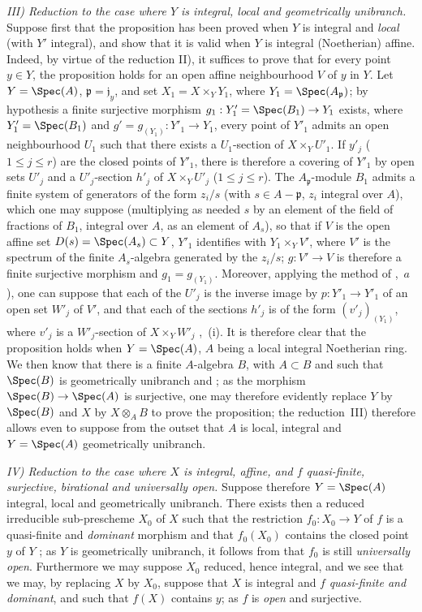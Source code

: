 \emph{III) Reduction to the case where $Y$ is integral, local and geometrically unibranch.}
Suppose first that the proposition has been proved when $Y$ is integral and \emph{local} (with $Y'$ integral), and show that it is valid when $Y$ is integral (Noetherian) affine.
Indeed, by virtue of the reduction II), it suffices to prove that for every point $y\in Y$, the proposition holds for an open affine neighbourhood $V$ of $y$ in $Y$.
Let $Y=\Spec(A)$, $\mathfrak{p}=\mathfrak{j}_y$, and set $X_1=X\times_Y Y_1$, where $Y_1=\Spec(A_\mathfrak{p})$; by hypothesis a finite surjective morphism $g_1:Y'_1=\Spec(B_1)\to Y_1$ exists, where $Y'_1=\Spec(B_1)$ and $g'=g_{(Y_1)}:Y'_1\to Y_1$, every point of $Y'_1$ admits an open neighbourhood $U_1$ such that there exists a $U_1$-section of $X\times_Y U'_1$.
If $y'_j$ ($1\leq j\leq r$) are the closed points of $Y'_1$, there is therefore a covering of $Y'_1$ by open sets $U'_j$ and a $U'_j$-section $h'_j$ of $X\times_Y U'_j$ ($1\leq j\leq r$).
The $A_\mathfrak{p}$-module $B_1$ admits a finite system of generators of the form $z_i/s$ (with $s\in A-\mathfrak{p}$,
$z_i$ integral over $A$), which one may suppose (multiplying as needed $s$ by an element of the field of fractions of $B_1$, integral over $A$, as an element of $A_s$), so that if $V$ is the open affine set $D(s)=\Spec(A_s)\subset Y$, $Y'_1$ identifies with $Y_1\times_Y V'$, where $V'$ is the spectrum of the finite $A_s$-algebra generated by the $z_i/s$; $g:V'\to V$ is therefore a finite surjective morphism and $g_1=g_{(Y_1)}$.
Moreover, applying the method of ,~$a$), one can suppose that each of the $U'_j$ is the inverse image by $p:Y'_1\to Y'_1$ of an open set $W'_j$ of $V'$, and that each of the sections $h'_j$ is of the form $(v'_j)_{(Y_1)}$, where $v'_j$ is a $W'_j$-section of $X\times_Y W'_j$ ,~(i).
It is therefore clear that the proposition holds when $Y=\Spec(A)$, $A$ being a local integral Noetherian ring.
We then know that there is a finite $A$-algebra $B$, with $A\subset B$ and such that $\Spec(B)$ is geometrically unibranch  and ; as the morphism $\Spec(B)\to\Spec(A)$ is surjective, one may therefore evidently replace $Y$ by $\Spec(B)$ and $X$ by $X\otimes_A B$ to prove the proposition; the reduction~III) therefore allows even to suppose from the outset that $A$ is local, integral and $Y=\Spec(A)$ geometrically unibranch.

\emph{IV) Reduction to the case where $X$ is integral, affine, and $f$ quasi-finite, surjective, birational and universally open.}
Suppose therefore $Y=\Spec(A)$ integral, local and geometrically unibranch.
There exists then a reduced irreducible sub-prescheme $X_0$ of $X$ such that the restriction $f_0:X_0\to Y$ of $f$ is a quasi-finite and \emph{dominant} morphism and that $f_0(X_0)$ contains the closed point $y$ of $Y$ ; as $Y$ is geometrically unibranch, it follows from  that $f_0$ is still \emph{universally open}.
Furthermore we may suppose $X_0$ reduced, hence integral, and we see that we may, by replacing $X$ by $X_0$, suppose that $X$ is integral and $f$ \emph{quasi-finite and dominant}, and such that $f(X)$ contains $y$; as $f$ is \emph{open} and surjective.

